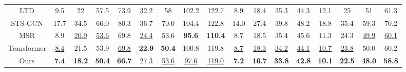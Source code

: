 \begin{table}[h]
{\begin{tabular}{c|cccc|cccc|cccc|cccc}
LTD   & 9.5           & 22            & 57.5          & 73.9          & 32.2          & 58            & 102.2         & 122.7          & 8.9           & 18.4          & 35.3          & 44.3          & 12.1          & 25            & 51            & 61.3          \\
STS-GCN              & 17.7                 & 34.5                 & 66.0                 & 80.3                          & 36.7                 & 70.0                 & 104.4                & 122.8                & 14.0                 & 27.4                 & 39.8                 & 48.2                 & 18.8                 & 35.4                 & 59.3                 & 70.2\\
MSR   & 8.9           & \underline{20.9}          & \underline{53.6}          & 69.8          & \underline{24.4}          & 53.6          & \textbf{95.6} & \textbf{110.4} & 8.7           & 18.5          & 35.4          & 45.6          & 11.3          & 24.3          & \underline{49.9}          & \underline{60.1}          \\
Transformer & \underline{8.4}           & 21.5          & 53.9          & \underline{69.8}          & \textbf{22.9}          & \textbf{50.4}          & 100.8         & 119.8          & \underline{8.7}           & \underline{18.3}          & \underline{34.2}          & \underline{44.1}          & \underline{10.7}          & \underline{23.8}          & 50.0          & 60.2          \\
Ours   & \textbf{7.4}  & \textbf{18.2} & \textbf{50.4} & \textbf{66.7} & 27.3 & \underline{53.6} & \underline{97.6}          & \underline{119.0}          & \textbf{7.2}  & \textbf{16.7} & \textbf{33.8} & \textbf{42.8} & \textbf{10.1} & \textbf{22.5} & \textbf{48.0} & \textbf{58.8} \\ \hline
\end{tabular}
}

\label{table:human3.6 short-term 8}
\end{table}


